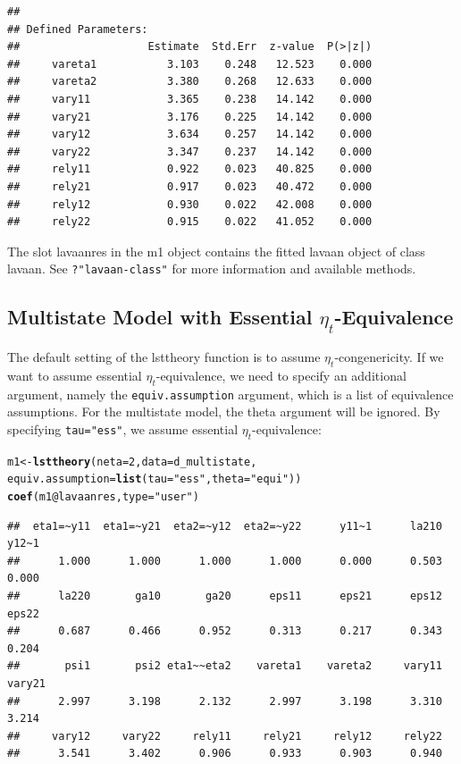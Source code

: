 \documentclass[10pt]{article}\usepackage[]{graphicx}\usepackage[]{xcolor}
\makeatletter
\newcommand{\hlnum}[1]{\textcolor[rgb]{0.686,0.059,0.569}{#1}}%
\newcommand{\hlstr}[1]{\textcolor[rgb]{0.192,0.494,0.8}{#1}}%
\newcommand{\hlopt}[1]{\textcolor[rgb]{0,0,0}{#1}}%
\newcommand{\hlstd}[1]{\textcolor[rgb]{0.345,0.345,0.345}{#1}}%
\newcommand{\hlkwb}[1]{\textcolor[rgb]{0.69,0.353,0.396}{#1}}%
\newcommand{\hlkwc}[1]{\textcolor[rgb]{0.333,0.667,0.333}{#1}}%
\newcommand{\hlkwd}[1]{\textcolor[rgb]{0.737,0.353,0.396}{\textbf{#1}}}%
\newenvironment{kframe}{%
 \def\at@end@of@kframe{}%
 \ifinner\ifhmode%
  \def\at@end@of@kframe{\end{minipage}}%
  \begin{minipage}{\columnwidth}%
 \fi\fi%
 \def\FrameCommand##1{\hskip\@totalleftmargin \hskip-\fboxsep
 \colorbox{shadecolor}{##1}\hskip-\fboxsep
     \hskip-\linewidth \hskip-\@totalleftmargin \hskip\columnwidth}%
 \MakeFramed {\advance\hsize-\width
   \@totalleftmargin\z@ \linewidth\hsize
   \@setminipage}}%
 {\par\unskip\endMakeFramed%
 \at@end@of@kframe}
\newenvironment{knitrout}{}{} %
\makeatother
\begin{document}
\begin{knitrout}
\begin{kframe}
\begin{verbatim}
## 
## Defined Parameters:
##                    Estimate  Std.Err  z-value  P(>|z|)
##     vareta1           3.103    0.248   12.523    0.000
##     vareta2           3.380    0.268   12.633    0.000
##     vary11            3.365    0.238   14.142    0.000
##     vary21            3.176    0.225   14.142    0.000
##     vary12            3.634    0.257   14.142    0.000
##     vary22            3.347    0.237   14.142    0.000
##     rely11            0.922    0.023   40.825    0.000
##     rely21            0.917    0.023   40.472    0.000
##     rely12            0.930    0.022   42.008    0.000
##     rely22            0.915    0.022   41.052    0.000
\end{verbatim}
\end{kframe}
\end{knitrout}
%
The slot lavaanres in the m1 object contains the fitted lavaan object of class lavaan. See \texttt{?"lavaan-class"} for more information and available methods.


\subsection{Multistate Model with Essential $\eta_t$-Equivalence}

The default setting of the lsttheory function is to assume $\eta_t$-congenericity. If we want to assume essential $\eta_t$-equivalence, we need to specify an additional argument, namely the \texttt{equiv.assumption} argument, which is a list of equivalence assumptions. For the multistate model, the theta argument will be ignored. By specifying \texttt{tau="ess"}, we assume essential $\eta_t$-equivalence:
%
\begin{knitrout}
\color{fgcolor}\begin{kframe}
\begin{alltt}
\hlstd{m1} \hlkwb{<-} \hlkwd{lsttheory}\hlstd{(}\hlkwc{neta}\hlstd{=}\hlnum{2}\hlstd{,} \hlkwc{data}\hlstd{=d_multistate,}
                \hlkwc{equiv.assumption}\hlstd{=}\hlkwd{list}\hlstd{(}\hlkwc{tau}\hlstd{=}\hlstr{"ess"}\hlstd{,} \hlkwc{theta}\hlstd{=}\hlstr{"equi"}\hlstd{))}
\hlkwd{coef}\hlstd{(m1}\hlopt{@}\hlkwc{lavaanres}\hlstd{,} \hlkwc{type}\hlstd{=}\hlstr{"user"}\hlstd{)}
\end{alltt}
\begin{verbatim}
##  eta1=~y11  eta1=~y21  eta2=~y12  eta2=~y22      y11~1      la210      y12~1 
##      1.000      1.000      1.000      1.000      0.000      0.503      0.000 
##      la220       ga10       ga20      eps11      eps21      eps12      eps22 
##      0.687      0.466      0.952      0.313      0.217      0.343      0.204 
##       psi1       psi2 eta1~~eta2    vareta1    vareta2     vary11     vary21 
##      2.997      3.198      2.132      2.997      3.198      3.310      3.214 
##     vary12     vary22     rely11     rely21     rely12     rely22 
##      3.541      3.402      0.906      0.933      0.903      0.940
\end{verbatim}
\end{kframe}
\end{knitrout}
%
\end{document}
